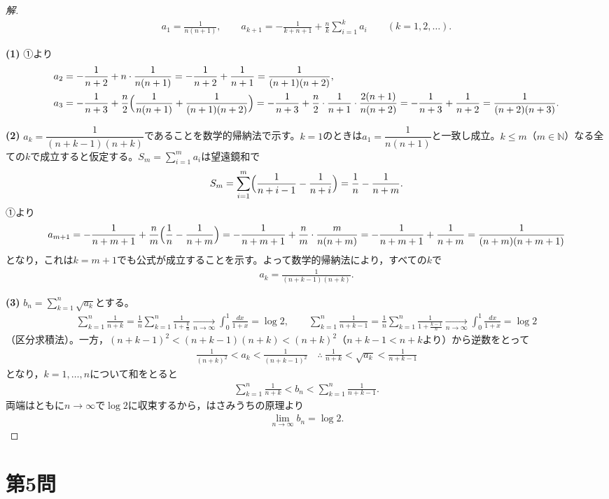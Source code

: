 \documentclass[../main.tex]{subfiles}
\begin{document}
\begin{proof}[解]
  \begin{align*}
    a_1=\frac1{n(n+1)},\qquad a_{k+1}=-\frac1{k+n+1}+\frac nk\sum_{i=1}^ka_i\qquad(k=1,2,\dots).\tag{①}
  \end{align*}

  \textbf{(1)} ①より
  \begin{align*}
    a_2&=-\frac1{n+2}+n\cdot\frac1{n(n+1)}=-\frac1{n+2}+\frac1{n+1}=\frac1{(n+1)(n+2)},\\
    a_3&=-\frac1{n+3}+\frac n2\Bigl(\frac1{n(n+1)}+\frac1{(n+1)(n+2)}\Bigr)=-\frac1{n+3}+\frac n2\cdot\frac1{n+1}\cdot\frac{2(n+1)}{n(n+2)}=-\frac1{n+3}+\frac1{n+2}=\frac1{(n+2)(n+3)}.
  \end{align*}

  \textbf{(2)} $a_k=\dfrac1{(n+k-1)(n+k)}$であることを数学的帰納法で示す。$k=1$のときは$a_1=\dfrac1{n(n+1)}$と一致し成立。$k\le m$（$m\in\mathbb N$）なる全ての$k$で成立すると仮定する。$S_m=\displaystyle\sum_{i=1}^ma_i$は望遠鏡和で
  \begin{align*}
    S_m=\sum_{i=1}^m\Bigl(\frac1{n+i-1}-\frac1{n+i}\Bigr)=\frac1n-\frac1{n+m}.
  \end{align*}
  ①より
  \begin{align*}
    a_{m+1}=-\frac1{n+m+1}+\frac nm\Bigl(\frac1n-\frac1{n+m}\Bigr)=-\frac1{n+m+1}+\frac nm\cdot\frac m{n(n+m)}=-\frac1{n+m+1}+\frac1{n+m}=\frac1{(n+m)(n+m+1)}
  \end{align*}
  となり，これは$k=m+1$でも公式が成立することを示す。よって数学的帰納法により，すべての$k$で
  \begin{align*}
    a_k=\frac1{(n+k-1)(n+k)}.
  \end{align*}

  \textbf{(3)} $b_n=\displaystyle\sum_{k=1}^n\sqrt{a_k}$とする。
  \begin{align*}
    \sum_{k=1}^n\frac1{n+k}=\frac1n\sum_{k=1}^n\frac1{1+\frac kn}\xrightarrow[n\to\infty]{}\int_0^1\frac{dx}{1+x}=\log2,\qquad
    \sum_{k=1}^n\frac1{n+k-1}=\frac1n\sum_{k=1}^n\frac1{1+\frac{k-1}n}\xrightarrow[n\to\infty]{}\int_0^1\frac{dx}{1+x}=\log2
  \end{align*}
  （区分求積法）。一方，$(n+k-1)^2<(n+k-1)(n+k)<(n+k)^2$（$n+k-1<n+k$より）から逆数をとって
  \begin{align*}
    \frac1{(n+k)^2}<a_k<\frac1{(n+k-1)^2}\quad\therefore\ \frac1{n+k}<\sqrt{a_k}<\frac1{n+k-1}
  \end{align*}
  となり，$k=1,\dots,n$について和をとると
  \begin{align*}
    \sum_{k=1}^n\frac1{n+k}<b_n<\sum_{k=1}^n\frac1{n+k-1}.
  \end{align*}
  両端はともに$n\to\infty$で$\log2$に収束するから，はさみうちの原理より
  \begin{align*}
    \lim_{n\to\infty}b_n=\log2.
  \end{align*}
\end{proof}

\newpage

\section*{第5問}

\newpage
\end{document}
